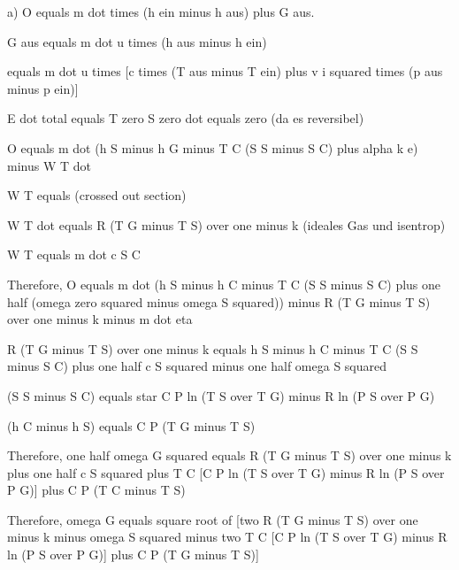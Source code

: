 a) O equals m dot times (h ein minus h aus) plus G aus.

G aus equals m dot u times (h aus minus h ein)

equals m dot u times [c times (T aus minus T ein) plus v i squared times (p aus minus p ein)]

E dot total equals T zero S zero dot equals zero (da es reversibel)

O equals m dot (h S minus h G minus T C (S S minus S C) plus alpha k e) minus W T dot

W T equals (crossed out section)

W T dot equals R (T G minus T S) over one minus k (ideales Gas und isentrop)

W T equals m dot c S C

Therefore, O equals m dot (h S minus h C minus T C (S S minus S C) plus one half (omega zero squared minus omega S squared)) minus R (T G minus T S) over one minus k minus m dot eta

R (T G minus T S) over one minus k equals h S minus h C minus T C (S S minus S C) plus one half c S squared minus one half omega S squared

(S S minus S C) equals star C P ln (T S over T G) minus R ln (P S over P G)

(h C minus h S) equals C P (T G minus T S)

Therefore, one half omega G squared equals R (T G minus T S) over one minus k plus one half c S squared plus T C [C P ln (T S over T G) minus R ln (P S over P G)] plus C P (T C minus T S)

Therefore, omega G equals square root of [two R (T G minus T S) over one minus k minus omega S squared minus two T C [C P ln (T S over T G) minus R ln (P S over P G)] plus C P (T G minus T S)]